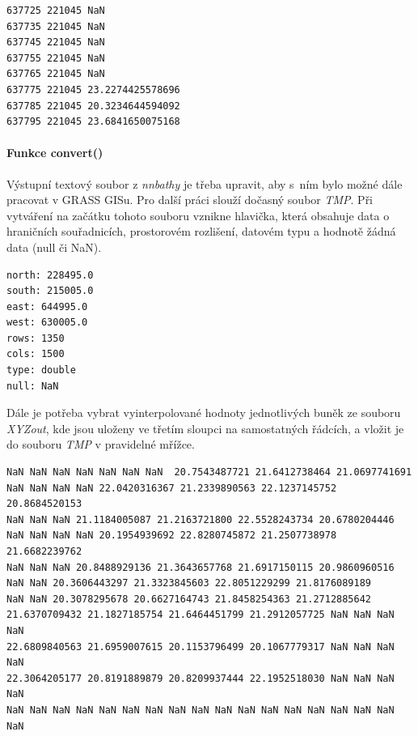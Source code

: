 \documentclass[12pt,a4paper]{article}
\begin{document}
\newpage
\lstset{basicstyle=\footnotesize}
\begin{lstlisting}[caption={XYZout}]
637725 221045 NaN
637735 221045 NaN
637745 221045 NaN
637755 221045 NaN
637765 221045 NaN
637775 221045 23.2274425578696
637785 221045 20.3234644594092
637795 221045 23.6841650075168
\end{lstlisting}

\bigskip
\paragraph{Funkce convert()}

Výstupní textový soubor z \emph{nnbathy} je třeba upravit, aby s~ním
bylo možné dále pracovat v GRASS GISu. Pro další práci slouží dočasný
soubor \emph{TMP}. Při vytváření na začátku tohoto souboru vznikne
hlavička, která obsahuje data o hraničních souřadnicích, prostorovém
rozlišení, datovém typu a hodnotě žádná data (null či NaN).

\lstset{basicstyle=\ttfamily}
\begin{lstlisting}[caption={Hlavička souboru TMP}]
north: 228495.0
south: 215005.0
east: 644995.0
west: 630005.0
rows: 1350
cols: 1500
type: double
null: NaN
\end{lstlisting}

Dále je potřeba vybrat vyinterpolované hodnoty jednotlivých buněk ze
souboru \emph{XYZout}, kde jsou uloženy ve třetím sloupci na
samostatných řádcích, a vložit je do souboru \emph{TMP} v pravidelné
mřížce.

\lstset{basicstyle=\footnotesize}
\begin{lstlisting}
NaN NaN NaN NaN NaN NaN NaN  20.7543487721 21.6412738464 21.0697741691 
NaN NaN NaN NaN 22.0420316367 21.2339890563 22.1237145752 20.8684520153 
NaN NaN NaN 21.1184005087 21.2163721800 22.5528243734 20.6780204446 
NaN NaN NaN NaN 20.1954939692 22.8280745872 21.2507738978 21.6682239762 
NaN NaN NaN 20.8488929136 21.3643657768 21.6917150115 20.9860960516 
NaN NaN 20.3606443297 21.3323845603 22.8051229299 21.8176089189 
NaN NaN 20.3078295678 20.6627164743 21.8458254363 21.2712885642 
21.6370709432 21.1827185754 21.6464451799 21.2912057725 NaN NaN NaN NaN 
22.6809840563 21.6959007615 20.1153796499 20.1067779317 NaN NaN NaN NaN 
22.3064205177 20.8191889879 20.8209937444 22.1952518030 NaN NaN NaN NaN 
NaN NaN NaN NaN NaN NaN NaN NaN NaN NaN NaN NaN NaN NaN NaN NaN NaN NaN 

\end{lstlisting}
\end{document}

